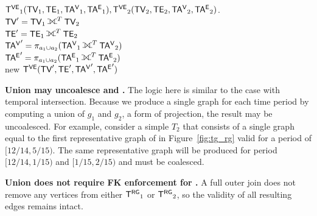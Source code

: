 \begin{algorithm}
\caption{Temporal graph union in \tve.}
\begin{algorithmic}[1]
\REQUIRE $\mathsf{T^{VE}}_1 (\textsf{TV}_1, \textsf{TE}_1, \mathsf{TA^{V}}_1, \mathsf{TA^{E}}_1), \mathsf{T^{VE}}_2 (\textsf{TV}_2, \textsf{TE}_2, \mathsf{TA^{V}}_2, \mathsf{TA^{E}}_2)$.\\
\STATE $\tv' = \tv_1 \fullouterjoin^T \tv_2$\\
\STATE $\te' = \te_1 \fullouterjoin^T \te_2$\\
\STATE $\tav' = \pi_{a_1 \cup a_2}(\tav_1 \fullouterjoin^T \tav_2)$\\
\STATE $\tae' = \pi_{a_1 \cup a_2}(\tae_1 \fullouterjoin^T \tae_2)$\\
\RETURN new $\mathsf{T^{VE}} (\textsf{TV}', \textsf{TE}', \mathsf{TA^{V}}', \mathsf{TA^{E}}')$\\
\end{algorithmic}
\label{alg:union}
\end{algorithm}

{\bf Union may uncoalesce \tve and \trg.}  The logic here is similar
to the case with temporal intersection.  Because we produce a single
graph for each time period by computing a union of $g_1$ and $g_2$, a
form of projection, the result may be uncoalesced.  For example,
consider a simple \tg $T_2$ that consists of a single graph equal to
the first representative graph of  in Figure~\ref{fig:tg_rg}
valid for a period of $[12/14, 5/15)$.  The same representative graph
  will be produced for period $[12/14, 1/15)$ and $[1/15, 2/15)$ and
      must be coalesced.

{\bf Union does not require FK enforcement for \tve.}  A full outer
join does not remove any vertices from either $\mathsf{T^{RG}}_1$ or $\mathsf{T^{RG}}_2$, so
the validity of all resulting edges remains intact.


